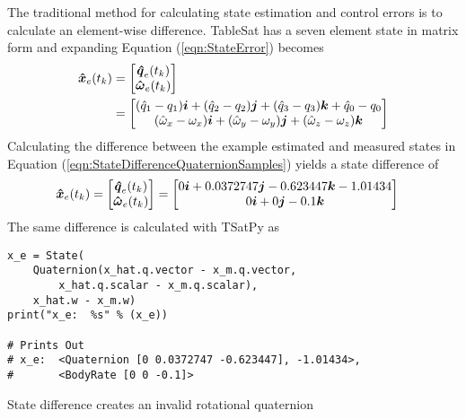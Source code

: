 The traditional method for calculating state estimation and control errors is to calculate an element-wise difference.  TableSat has a seven element state in matrix form and expanding Equation (\ref{eqn:StateError}) becomes
\begin{equation}
  \begin{aligned}
    \boldsymbol{\hat{x}}_e(t_{k}) &= \begin{bmatrix}  \boldsymbol{\hat{q}}_e(t_{k}) \\ \boldsymbol{\hat{\omega}}_e(t_{k}) \\ \end{bmatrix} \\
    &= \begin{bmatrix} (\hat{q}_1 - q_{1}) \boldsymbol{i} + (\hat{q}_2 - q_{2}) \boldsymbol{j} + (\hat{q}_3 - q_{3}) \boldsymbol{k} + \hat{q}_0 - q_{0} \\ (\hat{\omega}_x - \omega_{x}) \boldsymbol{i} + (\hat{\omega}_y - \omega_{y}) \boldsymbol{j} + (\hat{\omega}_z - \omega_{z}) \boldsymbol{k} \end{bmatrix}
  \end{aligned}
  \label{eqn:StateDifference}
\end{equation}
Calculating the difference between the example estimated and measured states in Equation (\ref{eqn:StateDifferenceQuaternionSamples}) yields a state difference of
\begin{equation}
  \begin{aligned}
    \boldsymbol{\hat{x}}_e(t_{k})
    = \begin{bmatrix}  \boldsymbol{\hat{q}}_e(t_{k}) \\ \boldsymbol{\hat{\omega}}_e(t_{k}) \end{bmatrix}
    &= \begin{bmatrix} 0 \boldsymbol{i} +0.0372747 \boldsymbol{j} -0.623447 \boldsymbol{k} -1.01434 \\ 0 \boldsymbol{i} +0 \boldsymbol{j} -0.1 \boldsymbol{k} \end{bmatrix}
  \end{aligned}
  \label{eqn:StateDifferenceSample}
\end{equation}
The same difference is calculated with TSatPy as
\begin{listing}[H]
\begin{singlespace}
  \begin{verbatim}
x_e = State(
    Quaternion(x_hat.q.vector - x_m.q.vector,
        x_hat.q.scalar - x_m.q.scalar),
    x_hat.w - x_m.w)
print("x_e:  %s" % (x_e))

# Prints Out
# x_e:  <Quaternion [0 0.0372747 -0.623447], -1.01434>,
#       <BodyRate [0 0 -0.1]>
  \end{verbatim}
\caption{State difference creates an invalid rotational quaternion}
\label{code:state_difference}
\nocite{minted}
\end{singlespace}
\end{listing}

